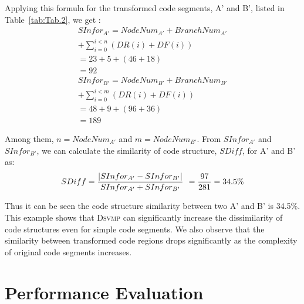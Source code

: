 \documentclass[conference]{IEEEtran}
\newcommand{\DSVMP}{\textsc{Dsvmp}\xspace}
\begin{document}
Applying this formula for the transformed code segments, A' and  B', listed in Table~\ref{tab:Tab.2},  we get :
\[\begin{array}{l}
 SInfo{r_{A'}} = NodeNu{m_{A'}} + BranchNu{m_{A'}} \\
                                                 + \sum\limits_{i = 0}^{i < n} {(DR(i) + DF(i))} \\
                                       = 23 + 5 + (46 + 18)\\
                                       = 92 \\
 SInfo{r_{B'}} = NodeNu{m_{B'}} + BranchNu{m_{B'}} \\
                                                 + \sum\limits_{i = 0}^{i < m} {(DR(i) + DF(i))}  \\
                                        = 48 + 9 + (96 + 36)\\
                                        =  189
\end{array}\]


Among them, $n=NodeNu{m_{A'}}$ and $m=NodeNu{m_{B'}}$. From $SInfo{r_{A'}}$ and $SInfo{r_{B'}}$, we can calculate the similarity of code structure, $SDiff$, for A' and B' as:
\[SDiff = \frac{{|SInfo{r_{A'}} - SInfo{r_{B'}}|}}{{SInfo{r_{A'}} + SInfo{r_{B'}}}}\;{\kern 1pt}  = \frac{{97}}{{281}} = 34.5\% \]

Thus it can be seen the code structure similarity between two A' and B' is  34.5\%. This example shows that \DSVMP can significantly
increase the dissimilarity of code structures even for simple code segments. We also observe that the similarity between transformed code
regions drops significantly as the complexity of original code segments increases.

\section{Performance Evaluation}
\end{document}

